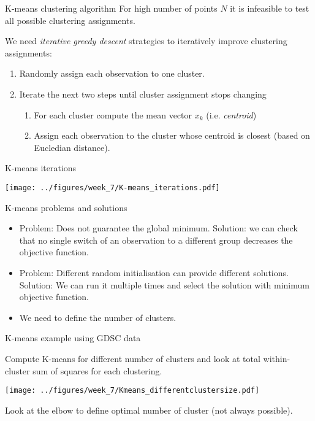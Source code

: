 \documentclass[notes]{beamer}          %
\begin{document}
\begin{frame}{K-means clustering algorithm}
For high number of points $N$ it is infeasible to test all possible clustering assignments.

\vspace{2mm} 

We need \textit{iterative greedy descent} strategies to iteratively improve clustering assignments: 

\begin{enumerate}
 \item Randomly assign each observation to one cluster.
 \item Iterate the next two steps until cluster assignment stops changing
 \begin{enumerate}
 	\item For each cluster compute the mean vector $x_k$ (i.e. \textit{centroid})
 	\item Assign each observation to the cluster whose centroid is closest (based on Eucledian distance).
 \end{enumerate}
\end{enumerate}

\end{frame}

\begin{frame}{K-means iterations}
\begin{center}
\texttt{[image: ../figures/week\_7/K-means\_iterations.pdf]}  
\end{center}
\end{frame}


\begin{frame}{K-means problems and solutions}
\begin{itemize}
 \item Problem: Does not guarantee the global minimum. Solution: we can check that no single switch of an observation to a different group decreases the objective function.
 \item Problem: Different random initialisation can provide different solutions. Solution: We can run it multiple times and select the solution with minimum objective function.
 \item We need to define the number of clusters.
\end{itemize}
\end{frame}

\begin{frame}{K-means example using GDSC data}

Compute K-means for different number of clusters and look at total within-cluster sum of squares for each clustering. 
\begin{center}
\texttt{[image: ../figures/week\_7/Kmeans\_differentclustersize.pdf]}  
\end{center}
Look at the elbow to define optimal number of cluster (not always possible).
\end{frame}
\end{document}
